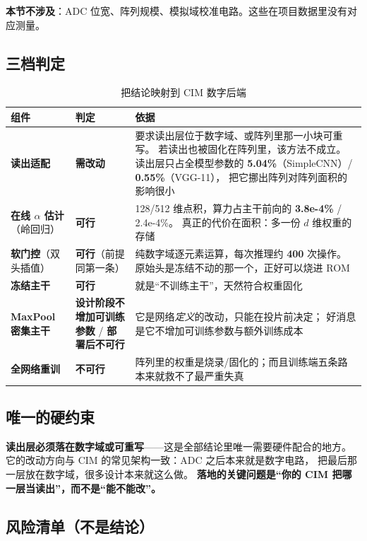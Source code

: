 \documentclass[11pt,a4paper]{ctexart}
\begin{document}
\textbf{本节不涉及}：ADC 位宽、阵列规模、模拟域校准电路。这些在项目数据里没有对应测量。

\subsection{三档判定}

\begin{table}[t]
\centering
\caption{把结论映射到 CIM 数字后端}
\label{tab:deploy}
\small
\begin{tabular}{p{3.2cm}p{2.2cm}p{8.6cm}}
\toprule
组件 & 判定 & 依据 \\
\midrule
\textbf{读出适配} & \textbf{需改动}
& 要求读出层位于数字域、或阵列里那一小块可重写。
  若读出也被固化在阵列里，该方法不成立。
  读出层只占全模型参数的 \textbf{5.04\%}（SimpleCNN）/ \textbf{0.55\%}（VGG-11），
  把它挪出阵列对阵列面积的影响很小 \\[3pt]
\textbf{在线 $\alpha$ 估计}（岭回归） & \textbf{可行}
& 128/512 维点积，算力占主干前向的 \textbf{3.8e-4\%} / 2.4e-4\%。
  真正的代价在面积：多一份 $d$ 维权重的存储 \\[3pt]
\textbf{软门控}（双头插值） & \textbf{可行}（前提同第一条）
& 纯数字域逐元素运算，每次推理约 \textbf{400} 次操作。
  原始头是冻结不动的那一个，正好可以烧进 ROM \\[3pt]
\textbf{冻结主干} & \textbf{可行}
& 就是“不训练主干”，天然符合权重固化 \\[3pt]
\textbf{MaxPool 密集主干} & \textbf{设计阶段不增加可训练参数} / \textbf{部署后不可行}
& 它是网络\emph{定义}的改动，只能在投片前决定；
  好消息是它不增加可训练参数与额外训练成本 \\[3pt]
\textbf{全网络重训} & \textbf{不可行}
& 阵列里的权重是烧录/固化的；而且训练端五条路本来就救不了最严重失真 \\
\bottomrule
\end{tabular}
\end{table}

\subsection{唯一的硬约束}

\textbf{读出层必须落在数字域或可重写}——这是全部结论里唯一需要硬件配合的地方。
它的改动方向与 CIM 的常见架构一致：ADC 之后本来就是数字电路，
把最后那一层放在数字域，很多设计本来就这么做。
\textbf{落地的关键问题是“你的 CIM 把哪一层当读出”，而不是“能不能改”。}

\subsection{风险清单（不是结论）}
\end{document}
